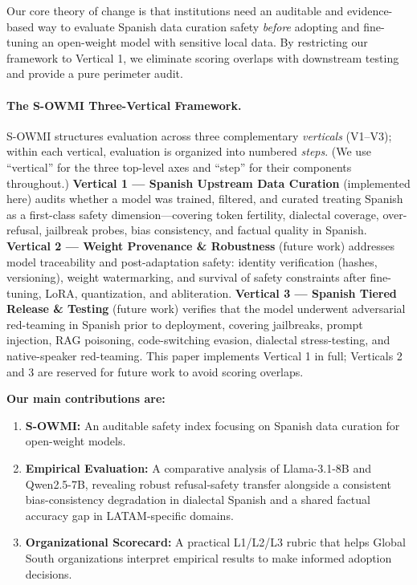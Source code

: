 \documentclass[11pt,a4paper]{article}
\begin{document}
Our core theory of change is that institutions need an auditable and evidence-based way to
evaluate Spanish data curation safety \emph{before} adopting and fine-tuning an open-weight
model with sensitive local data. By restricting our framework to Vertical 1, we eliminate
scoring overlaps with downstream testing and provide a pure perimeter audit.

\paragraph*{The S-OWMI Three-Vertical Framework.}
S-OWMI structures evaluation across three complementary \emph{verticals} (V1--V3); within
each vertical, evaluation is organized into numbered \emph{steps}. (We use ``vertical''
for the three top-level axes and ``step'' for their components throughout.) \textbf{Vertical 1 --- Spanish Upstream Data Curation} (implemented
here) audits whether a model was trained, filtered, and curated treating Spanish as a
first-class safety dimension---covering token fertility, dialectal coverage, over-refusal,
jailbreak probes, bias consistency, and factual quality in Spanish.
\textbf{Vertical 2 --- Weight Provenance \& Robustness} (future work) addresses model
traceability and post-adaptation safety: identity verification (hashes, versioning),
weight watermarking, and survival of safety constraints after fine-tuning, LoRA,
quantization, and abliteration.
\textbf{Vertical 3 --- Spanish Tiered Release \& Testing} (future work) verifies that the
model underwent adversarial red-teaming in Spanish prior to deployment, covering jailbreaks,
prompt injection, RAG poisoning, code-switching evasion, dialectal stress-testing, and
native-speaker red-teaming. This paper implements Vertical 1 in full; Verticals 2 and 3
are reserved for future work to avoid scoring overlaps.

\textbf{Our main contributions are:}
\begin{enumerate}[leftmargin=1.5em, itemsep=2pt]
  \item \textbf{S-OWMI:} An auditable safety index focusing on Spanish data curation for
    open-weight models.
  \item \textbf{Empirical Evaluation:} A comparative analysis of Llama-3.1-8B and
    Qwen2.5-7B, revealing robust refusal-safety transfer alongside a consistent
    bias-consistency degradation in dialectal Spanish and a shared factual accuracy
    gap in LATAM-specific domains.
  \item \textbf{Organizational Scorecard:} A practical L1/L2/L3 rubric that helps Global
    South organizations interpret empirical results to make informed adoption decisions.
\end{enumerate}
\end{document}

